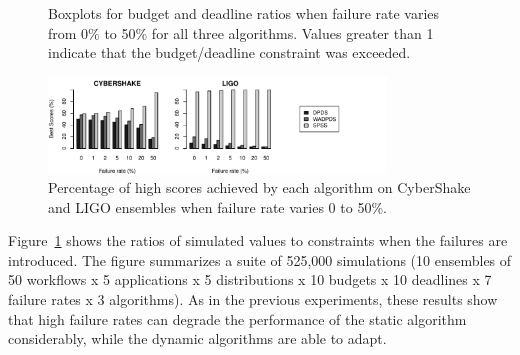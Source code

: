 \documentclass[preprint,5p]{elsarticle}
\begin{document}
\begin{figure}[tb]
    \hspace{2cm}
    \caption{Boxplots for budget and deadline ratios when failure rate varies
    from 0\% to 50\% for all three algorithms. Values greater than 1 indicate 
    that the budget/deadline constraint was exceeded.}
    \label{fig:failures}
\end{figure}
\begin{figure}[ht]
  \centering
  \includegraphics[width=0.8\textwidth]{run-finish-failures-test-0-output-distributions-failures}
  \caption{Percentage of high scores achieved by each algorithm on CyberShake and LIGO
  ensembles when failure rate varies 0 to 50\%.}
  \label{fig:failures-scores}
\end{figure}

Figure~\ref{fig:failures} shows the ratios of simulated values to constraints when
the failures are introduced. The figure summarizes a suite of 525,000
simulations (10 ensembles of 50 workflows x 5 applications x 5 distributions x
10 budgets x 10 deadlines x 7 failure rates x 3 algorithms). As in the previous 
experiments, these results show that high failure rates can degrade the
performance of the static algorithm considerably, while the dynamic algorithms
are able to adapt. 
\end{document}
